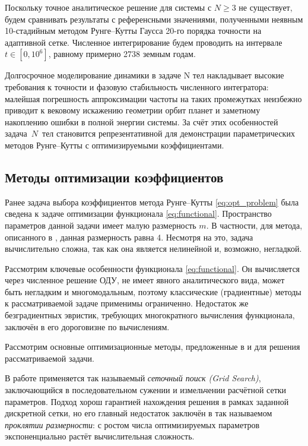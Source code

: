 

Поскольку точное аналитическое решение для системы с $N \geqslant 3$ не существует, будем сравнивать результаты с референсными значениями, полученными неявным 10-стадийным методом Рунге--Кутты Гаусса 20-го порядка точности на адаптивной сетке. Численное интегрирование будем проводить на интервале $t \in [0, 10^6]$, равному примерно 2738 земным годам.

Долгосрочное моделирование динамики в задаче N тел накладывает высокие требования к точности и фазовую стабильность численного интегратора: малейшая погрешность аппроксимации частоты на таких промежутках неизбежно приводит к вековому искажению геометрии орбит планет и заметному накоплению ошибки в полной энергии системы. За счёт этих особенностей задача~$N$~тел становится репрезентативной для демонстрации параметрических методов Рунге--Кутты с оптимизируемыми коэффициентами.


\subsection{Методы оптимизации коэффициентов}
\label{subsec:opt_methods}
Ранее задача выбора коэффициентов метода Рунге--Кутты \eqref{eq:opt_problem} была сведена к задаче оптимизации функционала \eqref{eq:functional}. Пространство параметров данной задачи имеет малую размерность $m$. В частности, для метода, описанного в \cite{Anastassi2023}, данная размерность равна 4. Несмотря на это, задача вычислительно сложна, так как она является нелинейной и, возможно, негладкой.

Рассмотрим ключевые особенности функционала \eqref{eq:functional}. Он вычисляется через численное решение ОДУ, не имеет явного аналитического вида, может быть негладким и многомодальным, поэтому классические (градиентные) методы к рассматриваемой задаче применимы ограниченно. Недостаток же безградиентных эвристик, требующих многократного вычисления функционала, заключён в его дороговизне по вычислениям.

Рассмотрим основные оптимизационные методы, предложенные в \cite{Anastassi2023} и \cite{Anastassi2025} для решения рассматриваемой задачи.

В работе \cite{Anastassi2023} применяется так называемый \textit{сеточный поиск (Grid Search)}, заключающийся в последовательном сужении и измельчении расчётной сетки параметров. Подход хорош гарантией нахождения решения в рамках заданной дискретной сетки, но его главный недостаток заключён в так называемом \textit{проклятии размерности}: с ростом числа оптимизируемых параметров экспоненциально растёт вычислительная сложность. 

